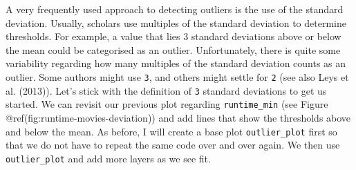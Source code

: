 \documentclass[
  letterpaper,
]{krantz}
\begin{document}
A very frequently used approach to detecting outliers is the use of the
standard deviation. Usually, scholars use multiples of the standard
deviation to determine thresholds. For example, a value that lies 3
standard deviations above or below the mean could be categorised as an
outlier. Unfortunately, there is quite some variability regarding how
many multiples of the standard deviation counts as an outlier. Some
authors might use \texttt{3}, and others might settle for \texttt{2}
(see also Leys et al. (2013)). Let's stick with the definition of
\texttt{3} standard deviations to get us started. We can revisit our
previous plot regarding \texttt{runtime\_min} (see Figure
@ref(fig:runtime-movies-deviation)) and add lines that show the
thresholds above and below the mean. As before, I will create a base
plot \texttt{outlier\_plot} first so that we do not have to repeat the
same code over and over again. We then use \texttt{outlier\_plot} and
add more layers as we see fit.
\end{document}

